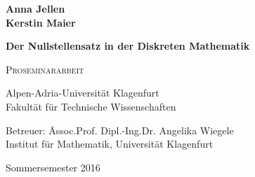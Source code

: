\documentclass{article}
\theoremstyle{dotless}
\begin{document}
%
%


\begin{titlepage}
\vspace*{1cm}
  \begin{center}   
	    \LARGE \textbf{Anna Jellen} \\
      \LARGE \textbf{Kerstin Maier}
  \end{center}
\vspace{1cm}
  \begin{center}
 \Huge \textbf{Der Nullstellensatz in der Diskreten Mathematik} 
  \end{center}
\vspace{1cm}
\begin{center}
\huge  \textsc{Proseminararbeit}
\end{center}
\vspace{1cm}
\begin{center}
\LARGE Alpen-Adria-Universit\"{a}t Klagenfurt\\
\LARGE Fakult\"{a}t f\"{u}r  Technische Wissenschaften
\end{center}
\vspace{1.5cm}
\Large
\begin{center}
 Betreuer:  \= Assoc.Prof. Dipl.-Ing.Dr. Angelika Wiegele 
 \\ Institut f\"{u}r Mathematik, Universität Klagenfurt\\ \end{center}
  \begin{flushright} Sommersemester 2016 \end{flushright}
\end{titlepage}



\nocite{*}

\renewcommand{\contentsname}{Inhaltsverzeichnis}

\tableofcontents







\listoffigures


\end{document}
